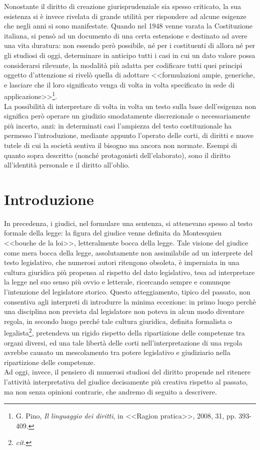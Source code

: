 Nonostante il diritto di creazione giurisprudenziale sia spesso criticato, la sua esistenza si è invece rivelata di grande utilità per rispondere ad alcune esigenze che negli anni si sono manifestate.
Quando nel 1948 venne varata la Costituzione italiana, si pensò ad un documento di una certa estensione e destinato ad avere una vita duratura: non essendo però possibile, né per i costituenti di allora né per gli studiosi di oggi, determinare in anticipo tutti i casi in cui un dato valore possa considerarsi rilevante, la modalità più adatta per codificare tutti quei principi oggetto d'attenzione si rivelò quella di adottare <<formulazioni ampie, generiche, e lasciare che il loro significato venga di volta in volta specificato in sede di applicazione>>\footnote{G. Pino, \textit{Il linguaggio dei diritti}, in <<Ragion pratica>>, 2008, 31, pp. 393-409.}.
\\La possibilità di interpretare di volta in volta un testo sulla base dell'esigenza non significa però operare un giudizio smodatamente discrezionale o necessariamente più incerto, anzi: in determinati casi l'ampiezza del testo costituzionale ha permesso l'introduzione, mediante appunto l'operato delle corti, di diritti e nuove tutele di cui la società sentiva il bisogno ma ancora non normate. Esempi di quanto sopra descritto (nonché protagonisti dell'elaborato), sono il diritto all'identità personale e il diritto all'oblio.

\section{Introduzione}
In precedenza, i giudici, nel formulare una sentenza, si attenevano spesso al testo formale della legge: la figura del giudice venne definita da Montesquieu <<bouche de la loi>>, letteralmente bocca della legge. 
Tale visione del giudice come mera bocca della legge, assolutamente non assimilabile ad un interprete del testo legislativo, che numerosi autori ritengono obsoleta, è imperniata in una cultura giuridica più propensa al rispetto del dato legislativo, tesa ad interpretare la legge nel suo senso più ovvio e letterale, ricercando sempre e comunque l’intenzione del legislatore storico. Questo atteggiamento, tipico del passato, non consentiva agli interpreti di introdurre la minima eccezione: in primo luogo perchè una disciplina non prevista dal legislatore non poteva in alcun modo diventare regola, in secondo luogo perché tale cultura giuridica, definita formalista o legalista\footnote{\textit{cit.}}, pretendeva un rigido rispetto della ripartizione delle competenze tra organi diversi, ed una tale libertà delle corti nell'interpretazione di una regola avrebbe causato un mescolamento tra potere legislativo e giudiziario nella ripartizione delle competenze.
\\Ad oggi, invece, il pensiero di numerosi studiosi del diritto propende nel ritenere l’attività interpretativa del giudice decisamente più creativa rispetto al passato, ma non senza opinioni contrarie, che andremo di seguito a descrivere.

